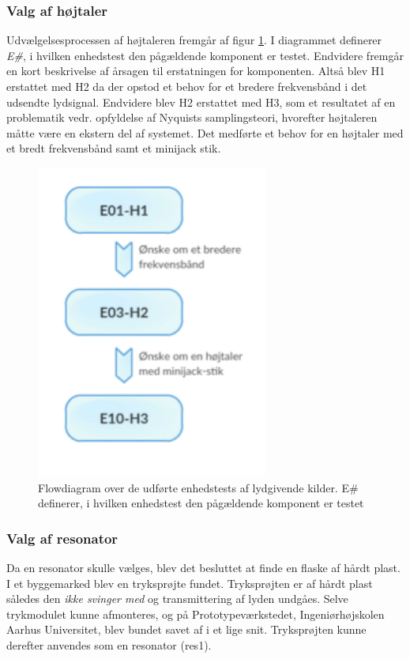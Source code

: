 \subsubsection{Valg af højtaler}
Udvælgelsesprocessen af højtaleren fremgår af figur \ref{fig:flowlyd}. I diagrammet definerer \textit{E\#}, i hvilken enhedstest den pågældende komponent er testet. Endvidere fremgår en kort beskrivelse af årsagen til erstatningen for komponenten. Altså blev H1 erstattet med H2 da der opstod et behov for et bredere frekvensbånd i det udsendte lydsignal. Endvidere blev H2 erstattet med H3, som et resultatet af en problematik vedr. opfyldelse af Nyquists samplingsteori, hvorefter højtaleren måtte være en ekstern del af systemet. Det medførte et behov for en højtaler med et bredt frekvensbånd samt et minijack stik. 

\begin{figure}[htb]
\centering
\includegraphics[width=3in]{flowdiagramelyd.png}
\caption{Flowdiagram over de udførte enhedstests af lydgivende kilder. E\# definerer, i hvilken enhedstest den pågældende komponent er testet}
\label{fig:flowlyd}
\end{figure}

\subsubsection{Valg af resonator}
Da en resonator skulle vælges, blev det besluttet at finde en flaske af hårdt plast. I et byggemarked blev en tryksprøjte fundet. Tryksprøjten er af hårdt plast således den \textit{ikke svinger med} og transmittering af lyden undgåes. Selve trykmodulet kunne afmonteres, og på Prototypeværkstedet, Ingeniørhøjskolen Aarhus Universitet, blev bundet savet af i et lige snit. Tryksprøjten kunne derefter anvendes som en resonator (res1).   

